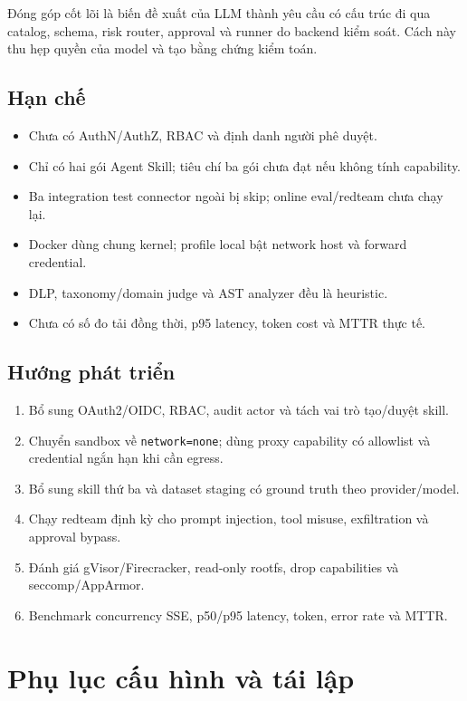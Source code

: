 \documentclass[12pt,a4paper]{article}
\begin{document}
Đóng góp cốt lõi là biến đề xuất của LLM thành yêu cầu có cấu trúc đi qua catalog, schema, risk router, approval và runner do backend kiểm soát. Cách này thu hẹp quyền của model và tạo bằng chứng kiểm toán.

\subsection{Hạn chế}
\begin{itemize}
  \item Chưa có AuthN/AuthZ, RBAC và định danh người phê duyệt.
  \item Chỉ có hai gói Agent Skill; tiêu chí ba gói chưa đạt nếu không tính capability.
  \item Ba integration test connector ngoài bị skip; online eval/redteam chưa chạy lại.
  \item Docker dùng chung kernel; profile local bật network host và forward credential.
  \item DLP, taxonomy/domain judge và AST analyzer đều là heuristic.
  \item Chưa có số đo tải đồng thời, p95 latency, token cost và MTTR thực tế.
\end{itemize}

\subsection{Hướng phát triển}
\begin{enumerate}
  \item Bổ sung OAuth2/OIDC, RBAC, audit actor và tách vai trò tạo/duyệt skill.
  \item Chuyển sandbox về \texttt{network=none}; dùng proxy capability có allowlist và credential ngắn hạn khi cần egress.
  \item Bổ sung skill thứ ba và dataset staging có ground truth theo provider/model.
  \item Chạy redteam định kỳ cho prompt injection, tool misuse, exfiltration và approval bypass.
  \item Đánh giá gVisor/Firecracker, read-only rootfs, drop capabilities và seccomp/AppArmor.
  \item Benchmark concurrency SSE, p50/p95 latency, token, error rate và MTTR.
\end{enumerate}

\appendix
\section{Phụ lục cấu hình và tái lập}
\end{document}
